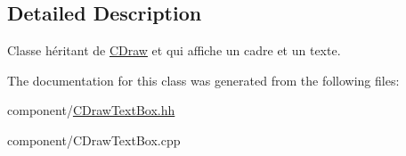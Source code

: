 \subsection{Detailed Description}
Classe héritant de \hyperlink{class_c_draw}{C\+Draw} et qui affiche un cadre et un texte. 

The documentation for this class was generated from the following files\+:\begin{DoxyCompactItemize}
\item 
component/\hyperlink{_c_draw_text_box_8hh}{C\+Draw\+Text\+Box.\+hh}\item 
component/C\+Draw\+Text\+Box.\+cpp\end{DoxyCompactItemize}
